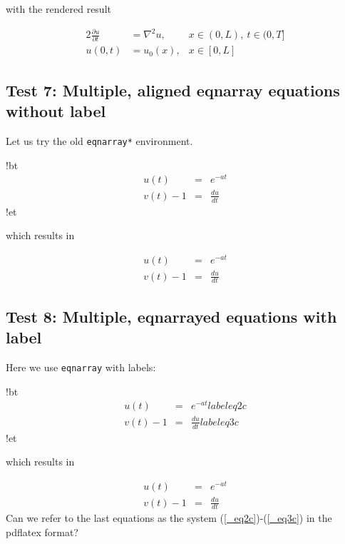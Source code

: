 \documentclass[%
oneside,                 %
final,                   %
10pt]{article}
\begin{document}
\elatexcod

with the rendered result

\begin{alignat}{2}
\frac{\partial u}{\partial t} &= \nabla^2 u, & x\in (0,L),
\ t\in (0,T]\\ 
u(0,t) &= u_0(x), & x\in [0,L]
\end{alignat}

\subsection{Test 7: Multiple, aligned eqnarray equations without label}

Let us try the old \texttt{eqnarray*} environment.








\blatexcod
!bt
\begin{eqnarray*}
u(t)&=& e^{-at}\\ 
v(t) - 1 &=& \frac{du}{dt}
\end{eqnarray*}
!et

\elatexcod

which results in

\begin{eqnarray*}
u(t)&=& e^{-at}\\ 
v(t) - 1 &=& \frac{du}{dt}
\end{eqnarray*}

\subsection{Test 8: Multiple, eqnarrayed equations with label}

Here we use \texttt{eqnarray} with labels:










\blatexcod
!bt
\begin{eqnarray}
u(t)&=& e^{-at}
label{eq2c}\\ 
v(t) - 1 &=& \frac{du}{dt}
label{eq3c}
\end{eqnarray}
!et

\elatexcod

which results in

\begin{eqnarray}
u(t)&=& e^{-at} \label{_eq2c}\\ 
v(t) - 1 &=& \frac{du}{dt} \label{_eq3c}
\end{eqnarray}
Can we refer to the last equations as the system (\ref{_eq2c})-(\ref{_eq3c})
in the pdflatex format?
\end{document}
